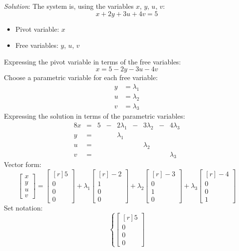 \documentclass[12pt]{article}
\begin{document}
\begin{enumerate}
\emph{Solution}:
The system is, using the variables $x$, $y$, $u$, $v$:
\[
x+2y+3u+4v=5
\]
\begin{itemize}
\item Pivot variable: $x$
\item Free variables: $y$, $u$, $v$
\end{itemize}
Expressing the pivot variable in terms of the free variables:
\[
x = 5-2y-3u-4v
\]
Choose a parametric variable for each free variable:
\begin{align*}
y &= \lambda_1\\
u &= \lambda_2\\
v &= \lambda_3
\end{align*}
Expressing the solution in terms of the parametric variables:
\begin{alignat*}{8}
x &{}={}& 5 &{}-{}& 2\lambda_1 &{}-{}& 3\lambda_2 &{}-{}& 4\lambda_3\\
y &{}={}&   &{}{}&   \lambda_1 &{}{}&             &{}{}&\\
u &{}={}&   &{}{}&             &{}{}&   \lambda_2 &{}{}&\\
v &{}={}&   &{}{}&             &{}{}&             &{}{}& \lambda_3
\end{alignat*}
Vector form:
\[
\begin{bmatrix}x\\y\\u\\v\end{bmatrix}=
\begin{bmatrix*}[r] 5\\ 0\\ 0\\ 0\end{bmatrix*}
+\lambda_1\begin{bmatrix*}[r] -2\\ 1\\ 0\\ 0\end{bmatrix*}
+\lambda_2\begin{bmatrix*}[r] -3\\ 0\\ 1\\ 0\end{bmatrix*}
+\lambda_3\begin{bmatrix*}[r] -4\\ 0\\ 0\\ 1\end{bmatrix*}
\]
Set notation:
\[
\left\{
\begin{bmatrix*}[r] 5\\ 0\\ 0\\ 0\end{bmatrix*}
\]
\end{enumerate}
\end{document}
